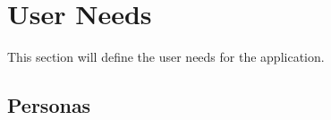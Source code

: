 \chapter{User Needs}
\label{appendix:user-needs}
This section will define the user needs for the application.

\section{Personas}
